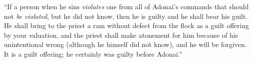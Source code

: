 \begin{biblechapter}
\verse “If a person when he sins \textit{violates} one from all of Adonai’s commands that should not \textit{be violated}, but he did not know, then he is guilty and he shall bear his guilt.
\verse He shall bring to the priest a ram without defect from the flock as a guilt offering by your valuation, and the priest shall make atonement for him because of his unintentional wrong (although he himself did not know), and he will be forgiven.
\verse It is a guilt offering; he certainly was guilty before Adonai.”
\end{biblechapter}


